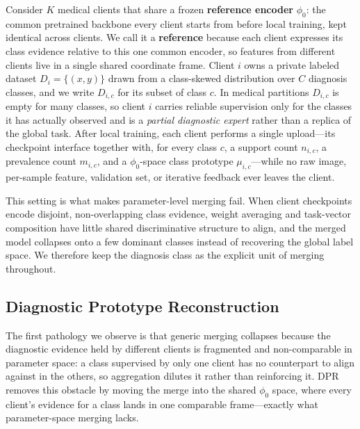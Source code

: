 \documentclass[letterpaper]{article} %
\begin{document}
Consider $K$ medical clients that share a frozen \textbf{reference encoder} $\phi_0$: the common pretrained backbone every client starts from before local training, kept identical across clients. We call it a \textbf{reference} because each client expresses its class evidence relative to this one common encoder, so features from different clients live in a single shared coordinate frame. Client $i$ owns a private labeled dataset $D_i=\{(x,y)\}$ drawn from a class-skewed distribution over $C$ diagnosis classes, and we write $D_{i,c}$ for its subset of class $c$. In medical partitions $D_{i,c}$ is empty for many classes, so client $i$ carries reliable supervision only for the classes it has actually observed and is a \emph{partial diagnostic expert} rather than a replica of the global task. After local training, each client performs a single upload---its checkpoint interface together with, for every class $c$, a support count $n_{i,c}$, a prevalence count $m_{i,c}$, and a $\phi_0$-space class prototype $\mu_{i,c}$---while no raw image, per-sample feature, validation set, or iterative feedback ever leaves the client.

This setting is what makes parameter-level merging fail. When client checkpoints encode disjoint, non-overlapping class evidence, weight averaging and task-vector composition have little shared discriminative structure to align, and the merged model collapses onto a few dominant classes instead of recovering the global label space. We therefore keep the diagnosis class as the explicit unit of merging throughout.

\subsection{Diagnostic Prototype Reconstruction}

The first pathology we observe is that generic merging collapses because the diagnostic evidence held by different clients is fragmented and non-comparable in parameter space: a class supervised by only one client has no counterpart to align against in the others, so aggregation dilutes it rather than reinforcing it. DPR removes this obstacle by moving the merge into the shared $\phi_0$ space, where every client's evidence for a class lands in one comparable frame---exactly what parameter-space merging lacks.
\end{document}
